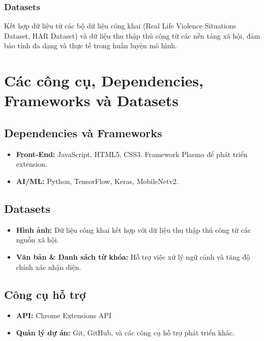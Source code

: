 \documentclass[12pt,a4paper]{article}
\begin{document}
\subsubsection{Datasets}

Kết hợp dữ liệu từ các bộ dữ liệu công khai (Real Life Violence Situations Dataset, HAR Dataset) và dữ liệu thu thập thủ công từ các nền tảng xã hội, đảm bảo tính đa dạng và thực tế trong huấn luyện mô hình.

\section{Các công cụ, Dependencies, Frameworks và Datasets}

\subsection{Dependencies và Frameworks}

\begin{itemize}
  \item \textbf{Front-End:} JavaScript, HTML5, CSS3. Framework Plasmo để phát triển extension.
  
  \item \textbf{AI/ML:} Python, TensorFlow, Keras, MobileNetv2.
\end{itemize}

\subsection{Datasets}

\begin{itemize}
  \item \textbf{Hình ảnh:} Dữ liệu công khai kết hợp với dữ liệu thu thập thủ công từ các nguồn xã hội.
  
  \item \textbf{Văn bản \& Danh sách từ khóa:} Hỗ trợ việc xử lý ngữ cảnh và tăng độ chính xác nhận diện.
\end{itemize}

\subsection{Công cụ hỗ trợ}

\begin{itemize}
  \item \textbf{API:} Chrome Extensions API
  
  \item \textbf{Quản lý dự án:} Git, GitHub, và các công cụ hỗ trợ phát triển khác.
\end{itemize}
\end{document}
